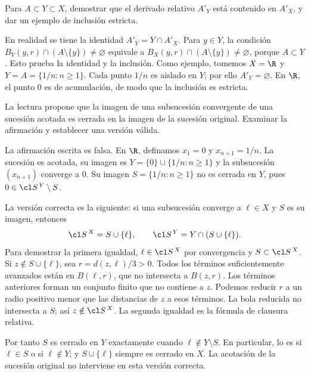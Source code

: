 \begin{ejercicio}\label{ej:lectura-4-4}
Para $A\subset Y\subset X$, demostrar que el derivado relativo $A'_Y$ está contenido en $A'_X$, y dar un ejemplo de inclusión estricta.
\end{ejercicio}
\begin{solucion}
En realidad se tiene la identidad $A'_Y=Y\cap A'_X$. Para $y\in Y$, la condición $B_Y(y,r)\cap(A\setminus\{y\})\ne\varnothing$ equivale a $B_X(y,r)\cap(A\setminus\{y\})\ne\varnothing$, porque $A\subset Y$. Esto prueba la identidad y la inclusión. Como ejemplo, tomemos $X=\R$ y $Y=A=\{1/n:n\ge1\}$. Cada punto $1/n$ es aislado en $Y$; por ello $A'_Y=\varnothing$. En $\R$, el punto $0$ es de acumulación, de modo que la inclusión es estricta.
\end{solucion}

\begin{ejercicio}\label{ej:lectura-4-5}
La lectura propone que la imagen de una subsucesión convergente de una sucesión acotada es cerrada en la imagen de la sucesión original. Examinar la afirmación y establecer una versión válida.
\end{ejercicio}
\begin{solucion}
La afirmación escrita es falsa. En $\R$, definamos $x_1=0$ y $x_{n+1}=1/n$. La sucesión es acotada, su imagen es $Y=\{0\}\cup\{1/n:n\ge1\}$ y la subsucesión $(x_{n+1})$ converge a $0$. Su imagen $S=\{1/n:n\ge1\}$ no es cerrada en $Y$, pues $0\in\cl S^{\,Y}\setminus S$.

La versión correcta es la siguiente: si una subsucesión converge a $\ell\in X$ y $S$ es su imagen, entonces
\[
\cl S^{\,X}=S\cup\{\ell\},\qquad
\cl S^{\,Y}=Y\cap(S\cup\{\ell\}).
\]
Para demostrar la primera igualdad, $\ell\in\cl S^{\,X}$ por convergencia y $S\subset\cl S^{\,X}$. Si $z\notin S\cup\{\ell\}$, sea $r=d(z,\ell)/3>0$. Todos los términos suficientemente avanzados están en $B(\ell,r)$, que no intersecta a $B(z,r)$. Los términos anteriores forman un conjunto finito que no contiene a $z$. Podemos reducir $r$ a un radio positivo menor que las distancias de $z$ a esos términos. La bola reducida no intersecta a $S$; así $z\notin\cl S^{\,X}$. La segunda igualdad es la fórmula de clausura relativa.

Por tanto $S$ es cerrado en $Y$ exactamente cuando $\ell\notin Y\setminus S$. En particular, lo es si $\ell\in S$ o si $\ell\notin Y$; y $S\cup\{\ell\}$ siempre es cerrado en $X$. La acotación de la sucesión original no interviene en esta versión correcta.
\end{solucion}

